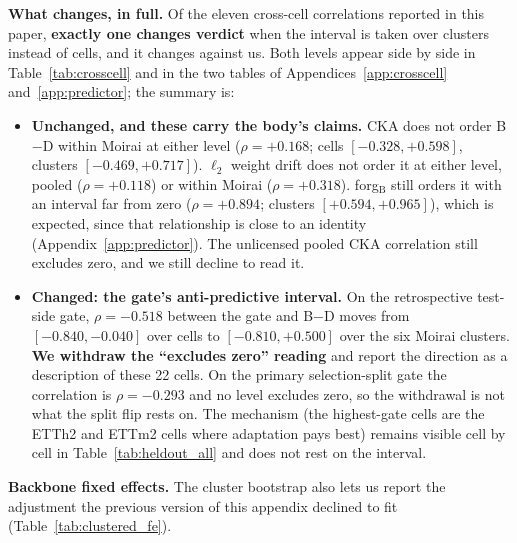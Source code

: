 \textbf{What changes, in full.} Of the eleven cross-cell correlations reported in
this paper, \textbf{exactly one changes verdict} when the interval is taken over
clusters instead of cells, and it changes against us. Both levels appear side by
side in Table~\ref{tab:crosscell} and in the two tables of
Appendices~\ref{app:crosscell} and~\ref{app:predictor}; the summary is:

\begin{itemize}
\item \textbf{Unchanged, and these carry the body's claims.} CKA does not order
  B$-$D within Moirai at either level ($\rho{=}{+}0.168$; cells
  $[-0.328, +0.598]$, clusters $[-0.469, +0.717]$). $\ell_2$ weight drift does not
  order it at either level, pooled ($\rho{=}{+}0.118$) or within Moirai
  ($\rho{=}{+}0.318$). forg$_\text{B}$ still orders it with an interval far from
  zero ($\rho{=}{+}0.894$; clusters $[+0.594, +0.965]$), which is expected,
  since that relationship is close to an identity
  (Appendix~\ref{app:predictor}). The unlicensed pooled CKA correlation still
  excludes zero, and we still decline to read it.
\item \textbf{Changed: the gate's anti-predictive interval.} On the retrospective
  test-side gate, $\rho{=}{-}0.518$ between the gate and B$-$D moves from
  $[-0.840, -0.040]$ over cells to $[-0.810, +0.500]$ over the six Moirai
  clusters. \textbf{We withdraw the ``excludes zero'' reading} and report the
  direction as a description of these 22 cells. On the primary selection-split
  gate the correlation is $\rho{=}{-}0.293$ and no level excludes zero, so the
  withdrawal is not what the split flip rests on. The mechanism (the highest-gate
  cells are the ETTh2 and ETTm2 cells where adaptation pays best) remains visible
  cell by cell in Table~\ref{tab:heldout_all} and does not rest on the interval.
\end{itemize}

\textbf{Backbone fixed effects.} The cluster bootstrap also lets us report the
adjustment the previous version of this appendix declined to fit
(Table~\ref{tab:clustered_fe}).

\begin{table}[ht]
\centering\footnotesize
\caption{Within-backbone slope of held-out B$-$D on CKA, in percentage points per
unit of CKA, with backbone identity absorbed as a fixed effect rather than by
subsetting. Intervals are $10{,}000$ cluster-bootstrap draws over the 15
$(\text{backbone}, \text{dataset})$ clusters of 31 cells; draws in which the fixed
effects are unidentified or the design is rank-deficient are discarded, and the
kept count is reported. Emitted by \texttt{scripts/clustered\_inference.py} from
\texttt{scripts/cka\_fixed\_effects.py}.}
\label{tab:clustered_fe}

\end{table}

